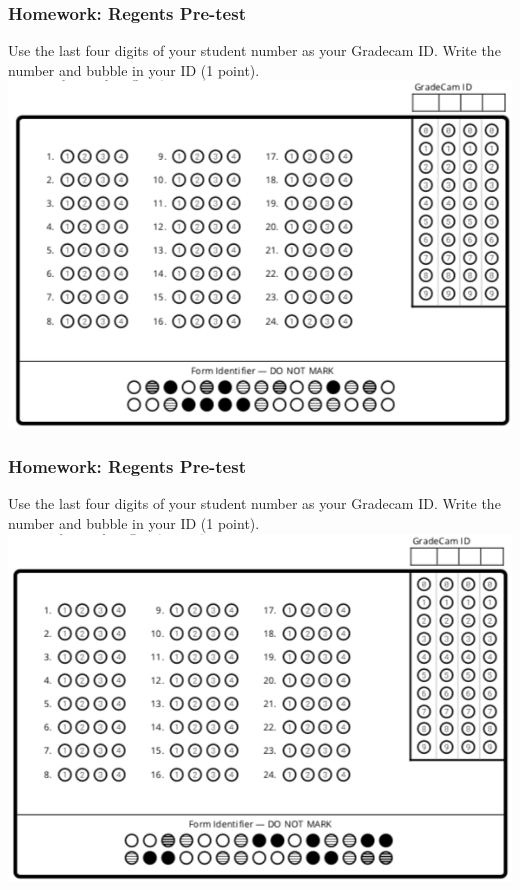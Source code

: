 \documentclass[12pt, twoside]{article}
\begin{document}
\subsubsection*{Homework: Regents Pre-test} %

Use the last four digits of your student number as your Gradecam ID. Write the number and bubble in your ID (1 point).\\[0.5cm]


\includegraphics[width=1.0\textwidth]{6-10HW_gradecam24-v1.png} \\ \vspace{0.5cm}

\newpage
\subsubsection*{Homework: Regents Pre-test} %

Use the last four digits of your student number as your Gradecam ID. Write the number and bubble in your ID (1 point).\\[0.5cm]


\includegraphics[width=1.0\textwidth]{6-10HW_gradecam24-v2.png} \\ \vspace{0.5cm}
\end{document}
